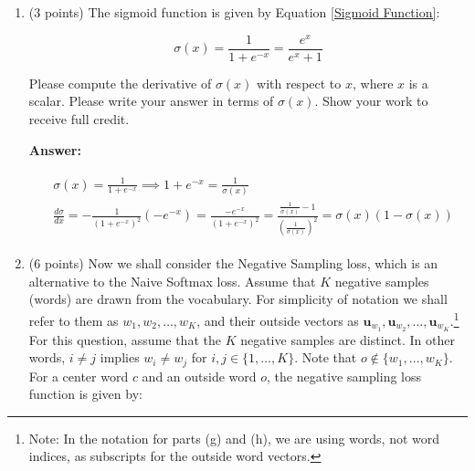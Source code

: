 \documentclass{article}
\newenvironment{answer}{
    {\bf Answer:} \sf \begingroup\color{black}
}{\endgroup}%
\begin{document}
\begin{enumerate}[label=(\alph*)]
\begin{shaded}
\begin{answer}

\begin{equation}
    f(x) = max(\alpha x, x) \implies \frac{df}{dx} = 
    \begin{cases}
        1, x > 0 \\
        \alpha, x < 0
    \end{cases}
\end{equation}

\end{answer}
\end{shaded}

\item (3 points) The sigmoid function is given by Equation \ref{Sigmoid Function}:

\begin{equation}
    \label{Sigmoid Function}
    \sigma (x) = \frac{1}{1 + e^{-x}} = \frac{e^{x}}{e^{x} + 1}
\end{equation}

Please compute the derivative of $\sigma(x)$ with respect to $x$, where $x$ is a scalar. Please write your answer in terms of $\sigma(x)$. Show your work to receive full credit.

\begin{shaded}
\begin{answer}
\begin{align}
\begin{split}
&\sigma (x) = \frac{1}{1 + e^{-x}} \implies 1 + e^{-x} = \frac{1}{\sigma(x)}\\
&\frac{d\sigma}{dx} = -\frac{1}{(1+ e^{-x})^2} (-e^{-x}) = \frac{-e^{-x}}{(1+ e^{-x})^2} = \frac{\frac{1}{\sigma(x)} - 1}{(\frac{1}{\sigma(x)})^2} =  \sigma(x)(1-\sigma(x))
\end{split}  
\end{align}
\end{answer}
\end{shaded}

\item (6 points) Now we shall consider the Negative Sampling loss, which is an alternative to the Naive Softmax loss.  Assume that $K$ negative samples (words) are drawn from the vocabulary. For simplicity of notation we shall refer to them as $w_1, w_2, \dots, w_K$, and their outside vectors as $\bm u_{w_1}, \bm u_{w_2}, \dots, \bm u_{w_K}$.\footnote{Note: In the notation for parts (g) and (h), we are using words, not word indices, as subscripts for the outside word vectors.} For this question, assume that the $K$ negative samples are distinct. In other words, $i\neq j$ implies $w_i\neq w_j$ for $i,j\in\{1,\dots,K\}$.
Note that $o\notin\{w_1, \dots, w_K\}$. 
For a center word $c$ and an outside word $o$, the negative sampling loss function is given by:


\end{enumerate}
\end{document}
